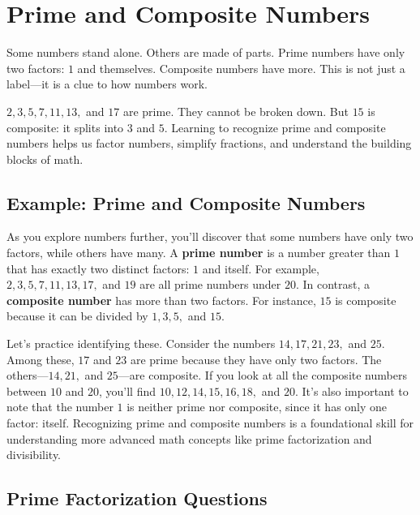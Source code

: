 \cleardoublepage
\section{Prime and Composite Numbers}

Some numbers stand alone. Others are made of parts. Prime numbers have only two factors: $1$ and themselves. Composite numbers have more. This is not just a label—it is a clue to how numbers work.

$2, 3, 5, 7, 11, 13,$ and $17$ are prime. They cannot be broken down. But $15$ is composite: it splits into $3$ and $5$. Learning to recognize prime and composite numbers helps us factor numbers, simplify fractions, and understand the building blocks of math.

\subsection{Example: Prime and Composite Numbers}

As you explore numbers further, you'll discover that some numbers have only two factors, while others have many. A \textbf{prime number} is a number greater than $1$ that has exactly two distinct factors: $1$ and itself. For example, $2, 3, 5, 7, 11, 13, 17,$ and $19$ are all prime numbers under $20$. In contrast, a \textbf{composite number} has more than two factors. For instance, $15$ is composite because it can be divided by $1, 3, 5,$ and $15$.

Let's practice identifying these. Consider the numbers $14, 17, 21, 23,$ and $25$. Among these, $17$ and $23$ are prime because they have only two factors. The others—$14, 21,$ and $25$—are composite. If you look at all the composite numbers between $10$ and $20$, you'll find $10, 12, 14, 15, 16, 18,$ and $20$. It's also important to note that the number $1$ is neither prime nor composite, since it has only one factor: itself. Recognizing prime and composite numbers is a foundational skill for understanding more advanced math concepts like prime factorization and divisibility.

\newpage 

\subsection{Prime Factorization Questions}

